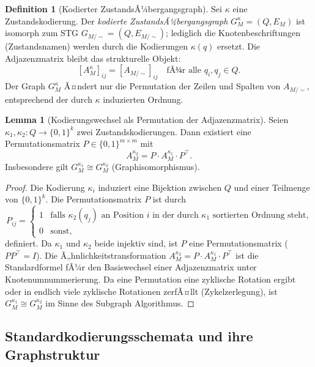 ﻿\documentclass[a4paper,12pt]{article}
\theoremstyle{definition}
\newtheorem{definition}{Definition}
\newtheorem{lemma}{Lemma}
\begin{document}
\begin{definition}[Kodierter ZustandsÃ¼bergangsgraph]\label{def:kodierterstg}
  Sei $\kappa$ eine Zustandskodierung. Der \emph{kodierte ZustandsÃ¼bergangsgraph}
  $G_M^\kappa = (Q, E_M)$ ist isomorph zum STG $G_{M/{\sim}} = (Q, E_{M/{\sim}})$;
  lediglich die Knotenbeschriftungen (Zustandsnamen) werden durch die Kodierungen
  $\kappa(q)$ ersetzt. Die Adjazenzmatrix bleibt das strukturelle Objekt:
  \[
    [A_M^\kappa]_{ij} = [A_{M/{\sim}}]_{ij}
    \quad \text{fÃ¼r alle } q_i, q_j \in Q.
  \]
  Der Graph $G_M^\kappa$ Ã¤ndert nur die Permutation der Zeilen und Spalten von
  $A_{M/{\sim}}$, entsprechend der durch $\kappa$ induzierten Ordnung.
\end{definition}

\begin{lemma}[Kodierungswechsel als Permutation der Adjazenzmatrix]\label{lemma:kodperm}
  Seien $\kappa_1, \kappa_2: Q \to \{0,1\}^k$ zwei Zustandskodierungen. Dann existiert
  eine Permutationsmatrix $P \in \{0,1\}^{m \times m}$ mit
  \[
    A_M^{\kappa_2} = P \cdot A_M^{\kappa_1} \cdot P^\top.
  \]
  Insbesondere gilt $G_M^{\kappa_1} \cong G_M^{\kappa_2}$ (Graphisomorphismus).
\end{lemma}

\begin{proof}
  Die Kodierung $\kappa_i$ induziert eine Bijektion zwischen $Q$ und einer Teilmenge
  von $\{0,1\}^k$. Die Permutationsmatrix $P$ ist durch
  \[
    P_{ij} = \begin{cases} 1 & \text{falls } \kappa_2(q_j) \text{ an Position } i
                                \text{ in der durch } \kappa_1 \text{ sortierten Ordnung steht,} \\
                           0 & \text{sonst,} \end{cases}
  \]
  definiert. Da $\kappa_1$ und $\kappa_2$ beide injektiv sind, ist $P$ eine
  Permutationsmatrix ($P P^\top = I$). Die Ã„hnlichkeitstransformation
  $A_M^{\kappa_2} = P \cdot A_M^{\kappa_1} \cdot P^\top$ ist die Standardformel fÃ¼r
  den Basiswechsel einer Adjazenzmatrix unter Knotenumnummerierung. Da eine Permutation
  eine zyklische Rotation ergibt oder in endlich viele zyklische Rotationen zerfÃ¤llt
  (Zykelzerlegung), ist $G_M^{\kappa_1} \cong G_M^{\kappa_2}$ im Sinne des
  Subgraph Algorithmus.
\end{proof}

\subsection{Standardkodierungsschemata und ihre Graphstruktur}
\end{document}
